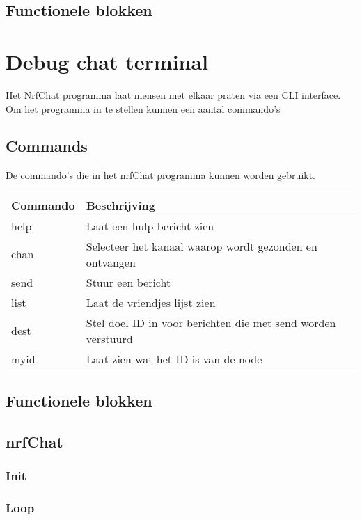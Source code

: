     \subsection{Functionele blokken}
\section{Debug chat terminal}

Het NrfChat programma laat mensen met elkaar praten via een CLI interface. Om het programma in te stellen kunnen een aantal commando's

\subsection{Commands}
De commando's die in het nrfChat programma kunnen worden gebruikt.

\begin{table}[h]
    \begin{tabular}{|l|l|} \hline
        \textbf{Commando} & \textbf{Beschrijving} \\\hline
        help & Laat een hulp bericht zien \\\hline
        chan & Selecteer het kanaal waarop wordt gezonden en ontvangen\\\hline
        send & Stuur een bericht \\\hline
        list & Laat de vriendjes lijst zien\\\hline
        dest & Stel doel ID in voor berichten die met send worden verstuurd \\\hline
        myid & Laat zien wat het ID is van de node \\\hline
    \end{tabular}
\end{table}

\subsection{Functionele blokken}

\subsection{nrfChat}
    \subsubsection{Init}
    \subsubsection{Loop}
